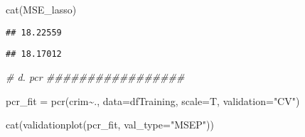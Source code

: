 \documentclass[
]{article}
\newenvironment{Shaded}{\begin{snugshade}}{\end{snugshade}}
\newcommand{\AttributeTok}[1]{\textcolor[rgb]{0.77,0.63,0.00}{#1}}
\newcommand{\CommentTok}[1]{\textcolor[rgb]{0.56,0.35,0.01}{\textit{#1}}}
\newcommand{\DecValTok}[1]{\textcolor[rgb]{0.00,0.00,0.81}{#1}}
\newcommand{\FunctionTok}[1]{\textcolor[rgb]{0.00,0.00,0.00}{#1}}
\newcommand{\NormalTok}[1]{#1}
\newcommand{\OtherTok}[1]{\textcolor[rgb]{0.56,0.35,0.01}{#1}}
\newcommand{\SpecialCharTok}[1]{\textcolor[rgb]{0.00,0.00,0.00}{#1}}
\newcommand{\StringTok}[1]{\textcolor[rgb]{0.31,0.60,0.02}{#1}}
\begin{document}
\begin{Shaded}
\begin{Highlighting}[]
\FunctionTok{cat}\NormalTok{(MSE\_lasso)}
\end{Highlighting}
\end{Shaded}

\begin{verbatim}
## 18.22559
\end{verbatim}

\begin{Shaded}
\end{Shaded}

\begin{verbatim}
## 18.17012
\end{verbatim}

\begin{Shaded}
\begin{Highlighting}[]
\CommentTok{\# d. pcr \#\#\#\#\#\#\#\#\#\#\#\#\#\#\#\#\#}

\NormalTok{pcr\_fit }\OtherTok{=} \FunctionTok{pcr}\NormalTok{(crim}\SpecialCharTok{\textasciitilde{}}\NormalTok{., }\AttributeTok{data=}\NormalTok{dfTraining, }\AttributeTok{scale=}\NormalTok{T, }\AttributeTok{validation=}\StringTok{"CV"}\NormalTok{)}

\FunctionTok{cat}\NormalTok{(}\FunctionTok{validationplot}\NormalTok{(pcr\_fit, }\AttributeTok{val\_type=}\StringTok{"MSEP"}\NormalTok{))}
\end{Highlighting}
\end{Shaded}
\end{document}
